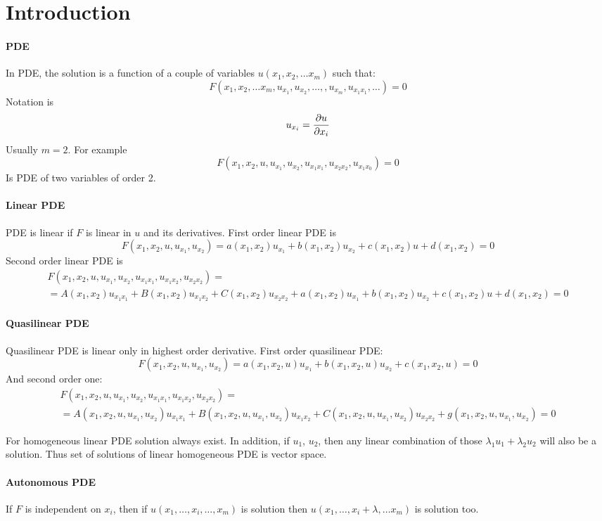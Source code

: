 \section{Introduction}
\paragraph{PDE}
In PDE, the solution is a function of a couple of variables $u(x_1, x_2, \dots x_m)$ such that:
$$F(x_1, x_2, \dots x_m, u_{x_1}, u_{x_2}, \dots, , u_{x_m}, u_{x_1x_1}, \dots) = 0$$
Notation is 
$$u_{x_i} = \pdv{u}{x_i}$$
Usually $m=2$. For example
$$F(x_1,x_2, u, u_{x_1}, u_{x_2}, u_{x_1x_1}, u_{x_2x_2}, u_{x_1x_0}) = 0$$
Is PDE of two variables of order 2.
\paragraph{Linear PDE}
PDE is linear if $F$ is linear in $u$ and its derivatives. First order linear PDE is
$$F(x_1,x_2, u, u_{x_1}, u_{x_2}) = a(x_1,x_2)u_{x_1} + b(x_1,x_2)u_{x_2} + c(x_1,x_2)u + d(x_1,x_2) = 0$$
Second order linear PDE is
\begin{align*}
F(x_1,x_2, u, u_{x_1}, u_{x_2}, u_{x_1x_1}, u_{x_1x_2}, u_{x_2x_2}) =\\= A(x_1,x_2) u_{x_1x_1} + B(x_1,x_2) u_{x_1x_2} + C(x_1,x_2) u_{x_2x_2} + a(x_1,x_2)u_{x_1} + b(x_1,x_2)u_{x_2} + c(x_1,x_2)u + d(x_1,x_2) = 0
\end{align*}
\paragraph{Quasilinear PDE}
Quasilinear PDE is linear only in highest order derivative. First order quasilinear PDE:
$$F(x_1,x_2, u, u_{x_1}, u_{x_2}) = a(x_1,x_2, u)u_{x_1} + b(x_1,x_2, u)u_{x_2} + c(x_1,x_2, u) = 0$$
And second order one:
\begin{align*}
F(x_1,x_2, u, u_{x_1}, u_{x_2}, u_{x_1x_1}, u_{x_1x_2}, u_{x_2x_2}) =\\= A(x_1,x_2, u, u_{x_1}, u_{x_2}) u_{x_1x_1} + B(x_1,x_2, u, u_{x_1}, u_{x_2}) u_{x_1x_2} + C(x_1,x_2, u, u_{x_1}, u_{x_2}) u_{x_2x_2} + g(x_1,x_2, u, u_{x_1}, u_{x_2}) = 0
\end{align*}

For homogeneous linear PDE solution always exist. In addition, if $u_1$, $u_2$, then any linear combination of those $\lambda_1 u_1 + \lambda_2 u_2$ will also be a solution. Thus set of solutions of linear homogeneous PDE is vector space.

\paragraph{Autonomous PDE } If $F$ is independent on $x_i$, then if $u(x_1, \dots, x_i, \dots, x_m)$ is solution then $u(x_1, \dots, x_i+\lambda, \dots x_m)$ is solution too. 

